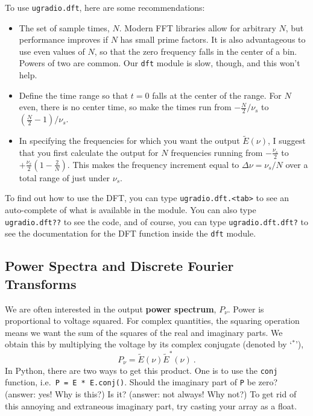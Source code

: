 \documentclass[11pt,preprint]{aastex}
\begin{document}
To use \verb$ugradio.dft$, here are some recommendations:
\begin{itemize}

\item The set of sample times, $N$. Modern FFT libraries allow for arbitrary $N$, but performance improves
if $N$ has small prime factors. 
It is also advantageous to use even values of $N$, so that the zero frequency falls in the center of a bin.
Powers of two are common. 
Our \verb$dft$ module is slow, though, and this won't help. 

\item Define the time range so that $t=0$ falls at the center of the range.
  For $N$ even, there is no center time, so make the times
  run from $-\frac{N}{2}/ \nu_s$ to $(\frac{N}{2} -1)/ \nu_s$.

\item 
  In specifying the frequencies for which you want the output $\tilde E(\nu)$, I 
  suggest that you first calculate the output for $N$
  frequencies running from $-\frac{\nu_s}{2}$ to $+\frac{\nu_s}{2}\left(1 - \frac{2}{N} \right)$. 
This makes the frequency
  increment equal to $\Delta \nu = \nu_s/N$ over a total range of
  just under $\nu_s$.

\end{itemize}

To find out how to use the DFT, you can type {\tt ugradio.dft.<tab>} to see an
auto-complete of what is available in the module.  You can also type {\tt ugradio.dft??} to see
the code, and of course, you can type {\tt ugradio.dft.dft?} to see the documentation for
the DFT function inside the {\tt dft} module.


\subsection{Power Spectra and Discrete Fourier Transforms} 
\label{pwrspect}

\noindent
We are often interested in the output {\bf power spectrum}, 
$P_\nu$.  Power is proportional to voltage squared.  For complex quantities, the squaring
operation means we want the sum of the squares of the real and imaginary
parts.  We obtain this by multiplying the voltage by its complex
conjugate (denoted by `$^*$'),
%
\begin{equation}
P_\nu = \tilde E(\nu) \tilde E^*(\nu) \ .
\end{equation}
% 
\noindent In Python, there are two ways to get this product.  One is to use
the \verb$conj$ function, i.e.\ {\tt P = E * E.conj()}.  Should the
imaginary part of \verb$P$ be zero? (answer: yes! Why is this?) Is it?
(answer: not always! Why not?) To get rid of this annoying and extraneous
imaginary part, try casting your array as a float.
 
\end{document}
